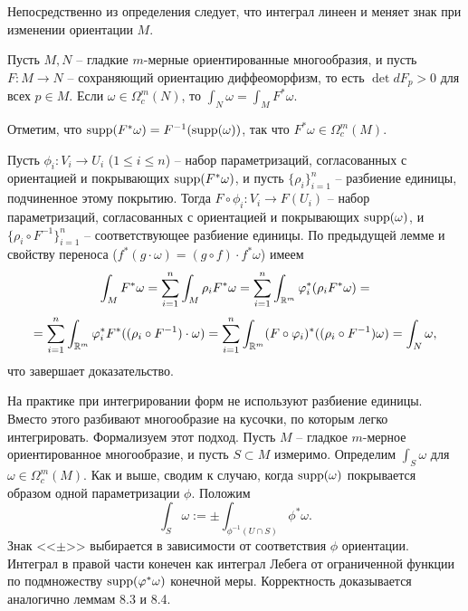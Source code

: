\begin{note}
	Непосредственно из определения следует, что интеграл линеен и меняет знак при изменении ориентации $M$.
\end{note}

\begin{theorem}
    Пусть $M, N$ -- гладкие $m$-мерные ориентированные многообразия, и пусть $F: M \to N$ -- сохраняющий ориентацию диффеоморфизм, то есть $\det dF_p > 0$ для всех $p \in M$. Если $\omega \in \Omega_c^m(N)$, то $\int_N \omega = \int_M F^*\omega$.
\end{theorem}

\begin{myproof}
    Отметим, что $\operatorname{supp}(F^*\omega) = F^{-1}(\operatorname{supp}(\omega))$, так что $F^*\omega \in \Omega_c^m(M)$.
    
	\vspace{5pt}
    Пусть $\phi_i: V_i \to U_i$ ($1 \leq i \leq n$) -- набор параметризаций, согласованных с ориентацией и покрывающих $\operatorname{supp}(F^*\omega)$, и пусть $\{\rho_i\}_{i=1}^n$ -- разбиение единицы, подчиненное этому покрытию.
	Тогда $F \circ \phi_i: V_i \to F(U_i)$ -- набор параметризаций, согласованных с ориентацией и покрывающих $\operatorname{supp}(\omega)$, и $\{\rho_i \circ F^{-1}\}_{i=1}^n$ -- соответствующее разбиение единицы. По предыдущей лемме и свойству переноса ($f^*(g \cdot \omega) = (g \circ f) \cdot f^* \omega$) имеем
    \[
    \int_M F^*\omega = \sum_{i=1}^n \int_M \rho_i F^* \omega = \sum_{i=1}^n \int_{\mathbb{R}^m} \varphi^*_i(\rho_i F^* \omega) = 
    \]
    \[
    = \sum_{i=1}^n \int_{\mathbb{R}^m} \varphi^*_i F^* ((\rho_i \circ F^{-1}) \cdot \omega) = \sum_{i=1}^n \int_{\mathbb{R}^m} (F \circ \varphi_i)^* ((\rho_i \circ F^{-1})\omega) = \int_N \omega,
    \]
    что завершает доказательство.
\end{myproof}

\begin{note}
	На практике при интегрировании форм не используют разбиение единицы. Вместо этого разбивают многообразие на кусочки, по которым легко интегрировать.
Формализуем этот подход.
Пусть $M$ -- гладкое $m$-мерное ориентированное многообразие, и пусть $S \subset M$ измеримо. Определим $\int_S \omega$ для $\omega \in \Omega_c^m(M)$. Как и выше, сводим к случаю, когда $\operatorname{supp}(\omega)$ покрывается образом одной параметризации $\phi$. Положим
\[
\int_S \omega := \pm \int_{\phi^{-1}(U \cap S)} \phi^*\omega.
\]
Знак <<$\pm$>> выбирается в зависимости от соответствия $\phi$ ориентации. Интеграл в правой части конечен как интеграл Лебега от ограниченной функции по подмножеству $\operatorname{supp}(\varphi^*\omega)$ конечной меры. Корректность доказывается аналогично леммам 8.3 и 8.4.
\end{note}

